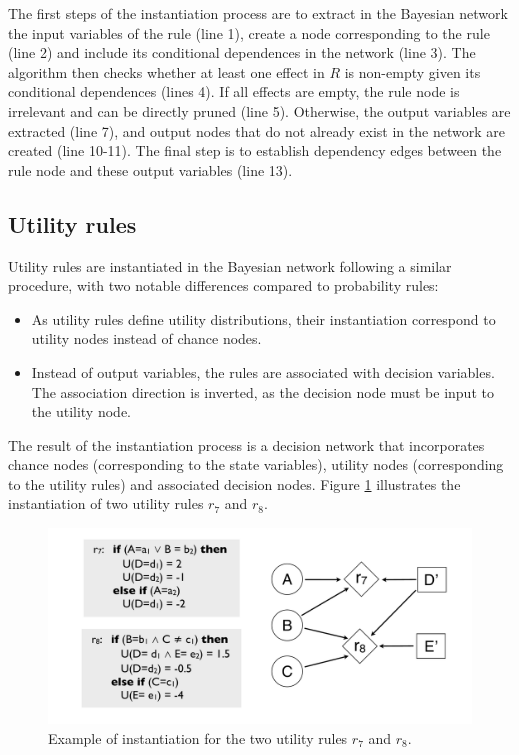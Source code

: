 The first steps of the instantiation process are to extract in the Bayesian network the input variables of the rule (line 1), create a node corresponding to the rule (line 2) and include its conditional dependences in the network (line 3).  The algorithm then checks whether at least one effect in $R$ is non-empty given its conditional dependences (lines 4).  If all effects are empty, the rule node is irrelevant and can be directly pruned (line 5). Otherwise, the output variables are extracted (line 7), and output nodes that do not already exist in the network are created (line 10-11). The final step is to establish dependency edges between the rule node and these output variables (line 13).


\subsection{Utility rules}

Utility rules are instantiated in the Bayesian network following a similar procedure, with two notable differences compared to probability rules: \begin{itemize}
\item As utility rules define utility distributions, their instantiation correspond to utility nodes instead of chance nodes.
\item Instead of output variables, the rules are associated with decision variables.  The association direction is inverted, as the decision node must be input to the utility node.
\end{itemize} 

The result of the instantiation process is a decision network that incorporates chance nodes (corresponding to the state variables), utility nodes (corresponding to the utility rules) and associated decision nodes. Figure \ref{fig:instantitionutil} illustrates the instantiation of two utility rules $r_7$ and $r_8$. 

\begin{figure}[h]
\centering
\includegraphics[scale=0.25]{imgs/ruleinstantiation2.pdf}
\caption{Example of instantiation for the two utility rules $r_7$ and $r_8$.}
\label{fig:instantitionutil}
\end{figure}


